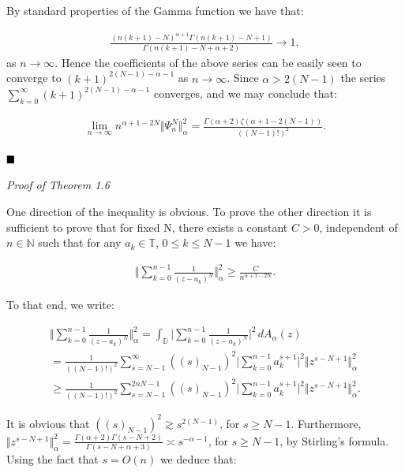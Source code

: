 \documentclass{amsart}[11pt]
\newcommand{\N}{\mathbb{N}} %
\newcommand{\D}{\mathbb{D}} %
\newcommand{\T}{\mathbb{T}} %
\newcommand{\no}[1]{\Vert #1 \Vert} %
\newcommand{\ra}{\rightarrow}
\renewcommand{\it}[1]{\textit{#1}}
\theoremstyle{definition}
\begin{document}
By standard properties of the Gamma function we have that:

\begin{gather*}
    \frac{(n(k+1)-N)^{\alpha + 1} \Gamma(n(k+1)-N+1)}{\Gamma(n(k+1)-N + \alpha + 2)} \ra 1,
\end{gather*}
as $n \ra \infty$. Hence the coefficients of the above series can be easily seen to converge to $(k+1)^{2(N-1)- \alpha -1}$ as $n \ra \infty$. Since $\alpha > 2(N-1)$ the series $\sum_{k=0}^{\infty} (k+1)^{2(N-1)- \alpha -1}$ converges, and we may conclude that:

\begin{gather*}
  \lim_{n \ra \infty} n^{\alpha + 1-2N}  \Vert \Psi_n^N \Vert_{\alpha}^2 = \frac{\Gamma(\alpha +2) \zeta(\alpha + 1 - 2(N-1))}{((N-1)!)^2}.
\end{gather*}

$\hfill \blacksquare$

\vspace{2mm}

\it{Proof of Theorem 1.6}

One direction of the inequality is obvious. To prove the other direction it is sufficient to prove that for fixed N, there exists a constant $C> 0$, independent of $n \in \N$ such that for any $a_k \in \T$, $0 \leq k \leq N-1$ we have:

\begin{gather*}
 \bigg \Vert \sum_{k=0}^{n-1} \frac{1}{(z-a_k)^N} \bigg \Vert_{\alpha}^2 \geq  \frac{C}{n^{\alpha+1 -2N}}.
\end{gather*}

To that end,  we write:

\begin{gather*}
    \bigg \Vert \sum_{k=0}^{n-1} \frac{1}{(z-a_k)^N} \bigg \Vert_{\alpha}^2 = \int_{\D} \bigg|\sum_{k=0}^{n-1} \frac{1}{(z-a_k)^N}  \bigg|^2 \, dA_{\alpha}(z) \\
    = \frac{1}{((N-1)!)^2} \sum_{s = N-1}^{\infty} ((s)_{N-1})^2 \bigg| \sum_{k=0}^{n-1} a_k^{s+1}\bigg|^2 \no{z^{s-N+1}}_{\alpha}^2 \\
    \geq \frac{1}{((N-1)!)^2} \sum_{s = N-1}^{2nN-1} ((s)_{N-1})^2 \bigg| \sum_{k=0}^{n-1} a_k^{s+1}\bigg|^2 \no{z^{s-N+1}}_{\alpha}^2.
\end{gather*}

It is obvious that $((s)_{N-1})^2 \gtrsim s^{2(N-1)}$, for $s \geq N-1$. Furthermore, $\no{z^{s-N+1}}_{\alpha}^2 = \frac{\Gamma(\alpha+2)\Gamma(s-N+2)}{\Gamma(s-N+ \alpha + 3)} \asymp s^{-\alpha - 1}$, for $s \geq N-1$, by Stirling's formula. Using the fact that $s = O(n)$ we deduce that:
\end{document}
